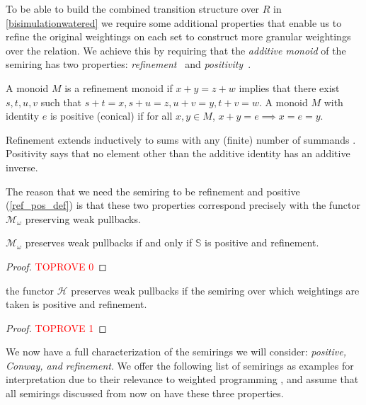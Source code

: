 \documentclass[a4paper,UKenglish,cleveref, autoref, thm-restate]{lipics-v2021}
\newcommand{\Mon}{\mathcal{M}_\omega}
\theoremstyle{plain}\newtheoremrep{thm}{Theorem}[section]
\begin{document}
	To be able to build the combined transition structure over $R$ in \cref{bisimulationwatered} we require some additional properties that enable us to refine the original weightings on each set to construct more granular weightings over the relation. We achieve this by requiring that the \textit{additive monoid} of the semiring has two properties: \emph{refinement}~\cite{refinementmonoids} and \emph{positivity}~\cite{gumm2009copower}.
	\begin{defn}\label{ref_pos_def}
		A monoid $M$ is a refinement monoid if $x+y=z+w$ implies that there exist  $s,t,u,v$ such that $s+t=x, s+u=z, u+v=y, t+v=w$. A monoid $M$ with identity $e$ is positive (conical) if for all $x,y\in M$, $x+y=e \implies x=e=y$.
	\end{defn} 
	 Refinement extends inductively to sums with any (finite) number of summands \cite{refinementmonoids}. Positivity says that no element other than the additive identity has an additive inverse. 
	 	\begin{toappendix}
		The reason that we need the semiring to be refinement and positive (\cref{ref_pos_def}) is that these two properties correspond precisely with the functor $\Mon$ preserving weak pullbacks.
		\begin{lem}
			$\Mon$ preserves weak pullbacks if and only if $\mathbb S$ is positive and refinement.
		\end{lem}
		\begin{proof}\textcolor{red}{TOPROVE 0}\end{proof}
		\begin{lem}
			the functor $\mathcal{H}$ preserves weak pullbacks if the semiring over which weightings are taken is positive and refinement. \label{refinementIsPullbacks}
		\end{lem}
		\begin{proof}\textcolor{red}{TOPROVE 1}\end{proof}
	\end{toappendix}
	We now have a full characterization of the semirings we will consider: \emph{positive, Conway, and refinement}. We offer the following list of semirings as examples for interpretation due to their relevance to weighted programming \cite{batz2022weighted}, and assume that all semirings discussed from now on have these three properties.
\end{document}
